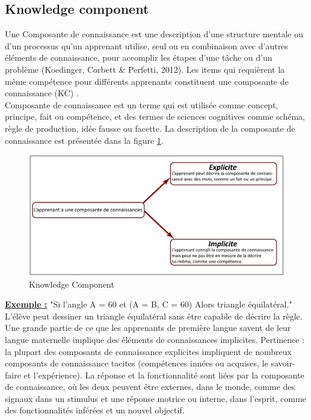\subsection{Knowledge component}
Une Composante de connaissance est une description d’une structure mentale ou d’un processus qu’un apprenant utilise, seul ou en combinaison avec d’autres éléments de connaissance, pour accomplir les étapes d’une tâche ou d’un problème (Koedinger, Corbett \& Perfetti, 2012). Les items qui requièrent la même compétence pour différents apprenants constituent une composante de connaissance (KC) \cite{nazaretsky2018kappa}. \\
Composante de connaissance est un terme qui est utilisée comme concept, principe, fait ou compétence, et des termes de sciences cognitives comme schéma, règle de production, idée fausse ou facette. \cite{vanlehn2006behavior}
La description de la composante de connaissance est présentée dans la figure \ref{knowledge_component}.

\begin{figure}[H]
	\begin{center}
		\includegraphics[width=\textwidth]{images/chapitre3/Knowledge_component.png}
	\end{center}
\caption{Knowledge Component}
\label{knowledge_component}
\end{figure}
\textbf{\underline{Exemple :}}
"Si l'angle A = 60 et (A = B, C = 60) Alors triangle équilatéral." \\
L'élève peut dessiner un triangle équilatéral sans être capable de décrire la règle. Une grande partie de ce que les apprenants de première langue savent de leur langue maternelle implique des éléments de connaissances implicites. Pertinence : la plupart des composants de connaissance explicites impliquent de nombreux composants de connaissance tacites (compétences innées ou acquises, le savoir-faire et l'expérience). La réponse et la fonctionnalité sont liées par la composante de connaissance, où les deux peuvent être externes, dans le monde, comme des signaux dans un stimulus et une réponse motrice ou interne, dans l'esprit, comme des fonctionnalités inférées et un nouvel objectif\cite{vanlehn2006behavior}.


